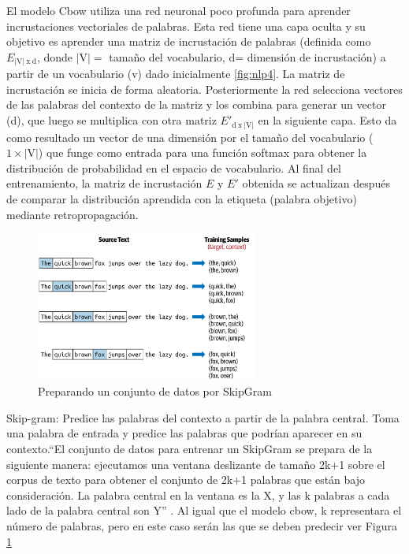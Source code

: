 \begin{itemize}
El modelo Cbow utiliza una red neuronal poco profunda para aprender incrustaciones vectoriales de palabras. Esta red tiene una capa oculta y su objetivo es aprender una matriz de incrustación de palabras (definida como $E_{ \left | \textrm{V}  \right |\: \textrm{x} \: \textrm{d}}$,  donde $\left | \textrm{V}  \right | = $ tamaño del vocabulario, d= dimensión de incrustación)  a partir de un vocabulario (v)  dado inicialmente  \ref{fig:nlp4}. La matriz de incrustación se inicia de forma aleatoria. Posteriormente  la red selecciona vectores de las palabras del contexto de la matriz y los combina para generar un vector (d), que luego se multiplica con otra matriz ${E}'_{ \textrm{d} \: \textrm{x}  \:\left | \textrm{V}  \right | }$ en la siguiente capa. Esto da como resultado un vector de una dimensión por el tamaño del vocabulario ( $1 \times \left | \textrm{V}  \right |$) que funge como entrada para una función softmax para obtener la distribución de probabilidad en el espacio de vocabulario. Al final del entrenamiento, la matriz de incrustación $E$ y $E'$ obtenida se actualizan después de comparar la distribución aprendida con la etiqueta (palabra objetivo) mediante retropropagación.

\begin{figure}[h!]
	\includegraphics[width=0.65\textwidth]{capitulo3/figuras/nlp5.png}
	\caption{Preparando un conjunto de datos por SkipGram}
	\label{fig:nlp5}
\end{figure}

Skip-gram: Predice las palabras del contexto a partir de la palabra central. Toma una palabra de entrada y predice las palabras que podrían aparecer en su contexto.``El conjunto de datos para entrenar un SkipGram se prepara de la siguiente manera: ejecutamos una ventana deslizante de tamaño 2k+1 sobre el corpus de texto para obtener el conjunto de 2k+1 palabras que están bajo consideración. La palabra central en la ventana es la X, y las k palabras a cada lado de la palabra central son Y'' \cite[p. 101]{vajjala2020practical}. Al igual que el modelo cbow, k representara el número de palabras, pero en este caso serán las que se deben predecir ver Figura \ref{fig:nlp5}




\end{itemize}
